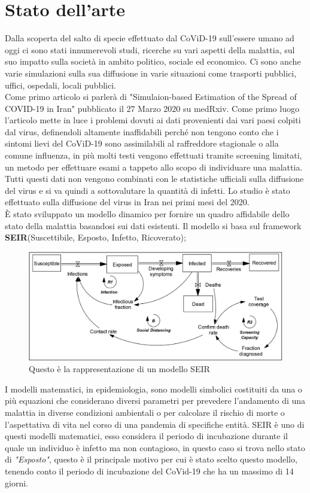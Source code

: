 \documentclass[12pt, openany]{book}
\begin{document}
	\chapter{Stato dell'arte}
		Dalla scoperta del salto di specie effettuato dal CoViD-19 sull'essere umano ad oggi ci sono stati innumerevoli studi, ricerche su vari aspetti della malattia, sul suo impatto sulla società in ambito politico, sociale ed economico. Ci sono anche varie simulazioni sulla sua diffusione in varie situazioni come trasporti pubblici, uffici, ospedali, locali pubblici. \\
		Come primo articolo si parlerà di "Simulaion-based Estimation of the Spread of COVID-19 in Iran" \cite{Iran} pubblicato il 27 Marzo 2020 su medRxiv. Come primo luogo l'articolo mette in luce i problemi dovuti ai dati provenienti dai vari paesi colpiti dal virus, definendoli altamente inaffidabili perché non tengono conto che i sintomi lievi del CoViD-19 sono assimilabili al raffreddore stagionale o alla comune influenza, in più molti testi vengono effettuati tramite screening limitati, un metodo per effettuare esami a tappeto allo scopo di individuare una malattia. Tutti questi dati non vengono combinati con le statistiche ufficiali sulla diffusione del virus e si va quindi a sottovalutare la quantità di infetti.
		Lo studio è stato effettuato sulla diffusione del virus in Iran nei primi mesi del 2020.\\
		È stato sviluppato un modello dinamico per fornire un quadro affidabile dello stato della malattia basandosi sui dati esistenti. Il modello si basa sul framework \textbf{SEIR}(Suscettibile, Esposto, Infetto, Ricoverato); 
		\begin{figure}[H]
			\centering
			\includegraphics[width=1\linewidth]{"Immagini/SEIR"}
			\caption{Questo è la rappresentazione di un modello SEIR }
			\label{fig:SEIR}
		\end{figure}
		I modelli matematici, in epidemiologia, sono modelli simbolici costituiti da una o più equazioni che considerano diversi parametri per prevedere l'andamento di una malattia in diverse condizioni ambientali o per calcolare il rischio di morte o l'aspettativa di vita nel corso di una pandemia di specifiche entità. SEIR è uno di questi modelli matematici, esso considera il periodo di incubazione durante il quale un individuo è infetto ma non contagioso, in questo caso si trova nello stato di \emph{"Esposto"}, questo è il principale motivo per cui è stato scelto questo modello, tenendo conto il periodo di incubazione del CoVid-19 che ha un massimo di 14 giorni.\\
\end{document}
